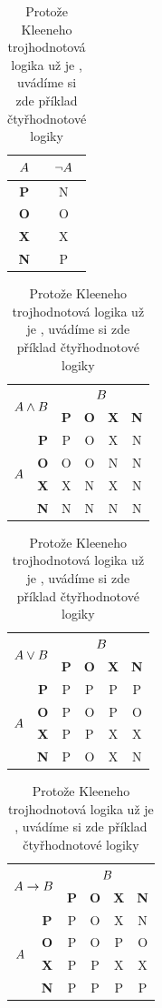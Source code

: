 \documentclass[11pt,a4paper]{article}
\begin{document}
\begin{table}[h]
    \centering
    \begin{tabular}{|c|c|}
    \hline
        $\mathnormal{A}$ & $\neg \mathnormal{A}$ \\ \hline
        \textbf{P} & N \\ \hline
        \textbf{O} & O \\ \hline
        \textbf{X} & X \\ \hline
        \textbf{N} & P \\ \hline
    \end{tabular}
    \begin{tabular}{|c|c|c|c|c|c|}
    \hline
         \multicolumn{2}{|c|}{\multirow{2}{*}{$\mathnormal{A}\land\mathnormal{B}$}} & \multicolumn{4}{c|}{$\mathnormal{B}$} \\ \cline{3-6}
         \multicolumn{2}{|c|}{} & \textbf{P} & \textbf{O} & \textbf{X} & \textbf{N} \\ \hline
         \multirow{4}{*}{$\mathnormal{A}$}& \textbf{P} & P &    O & X & N \\ \cline{2-6}
         & \textbf{O} & O & O & N & N \\ \cline{2-6}
         & \textbf{X} & X & N & X & N \\ \cline{2-6}
         & \textbf{N} & N & N & N & N \\ \hline
    \end{tabular}
    \begin{tabular}{|c|c|c|c|c|c|}
    \hline
         \multicolumn{2}{|c|}{\multirow{2}{*}{$\mathnormal{A}\lor\mathnormal{B}$}} & \multicolumn{4}{c|}{$\mathnormal{B}$} \\ \cline{3-6}
         \multicolumn{2}{|c|}{} & \textbf{P} & \textbf{O} & \textbf{X} & \textbf{N} \\ \hline
         \multirow{4}{*}{$\mathnormal{A}$}& \textbf{P} & P & P & P & P \\ \cline{2-6}
         & \textbf{O} & P & O & P & O \\ \cline{2-6}
         & \textbf{X} & P & P & X & X \\ \cline{2-6}
         & \textbf{N} & P & O & X & N \\ \hline
    \end{tabular}
    \begin{tabular}{|c|c|c|c|c|c|}
    \hline
         \multicolumn{2}{|c|}{\multirow{2}{*}{$\mathnormal{A}\to\mathnormal{B}$}} & \multicolumn{4}{c|}{$\mathnormal{B}$} \\ \cline{3-6}
         \multicolumn{2}{|c|}{} & \textbf{P} & \textbf{O} & \textbf{X} & \textbf{N} \\ \hline
         \multirow{4}{*}{$\mathnormal{A}$}& \textbf{P} & P & O & X & N \\ \cline{2-6}
         & \textbf{O} & P & O & P & O \\ \cline{2-6}
         & \textbf{X} & P & P & X & X \\ \cline{2-6}
         & \textbf{N} & P & P & P & P \\ \hline
    \end{tabular}
    \caption{Protože Kleeneho trojhodnotová logika už je , uvádíme si zde příklad čtyřhodnotové logiky}
    \label{tab:tab2}
\end{table}
\end{document}
